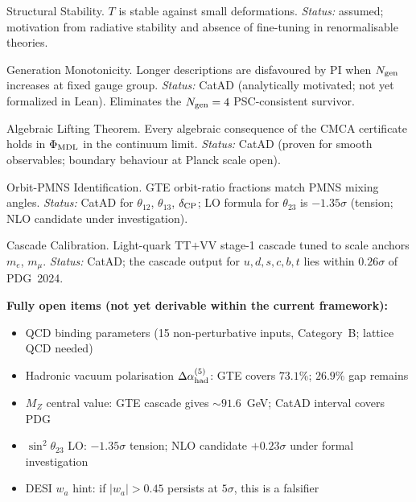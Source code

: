 \documentclass[11pt,openany]{book}
\theoremstyle{remark}
\begin{document}
\begin{appendices}
\begin{tcolorbox}[colback=blue!5,colframe=blue!50,
  title={\textbf{Named Assumptions and Open Gaps}},
  fonttitle=\bfseries,left=6pt,right=6pt,top=5pt,bottom=5pt]
\begin{description}[noitemsep,topsep=4pt,leftmargin=2.2cm,labelwidth=2.0cm,font=\bfseries]
\item[NM*]  Structural Stability.  $T$ is stable against small deformations.
  \emph{Status:} assumed; motivation from radiative stability and absence of fine-tuning
  in renormalisable theories.
\item[Gen-Mon]  Generation Monotonicity.  Longer descriptions are disfavoured by PI when
  $N_{\rm gen}$ increases at fixed gauge group.  \emph{Status:} CatAD (analytically
  motivated; not yet formalized in Lean).  Eliminates the $N_{\rm gen}=4$ PSC-consistent
  survivor.
\item[Lifting]  Algebraic Lifting Theorem.  Every algebraic consequence of the CMCA
  certificate holds in $\Phi_{\rm MDL}$ in the continuum limit.  \emph{Status:} CatAD
  (proven for smooth observables; boundary behaviour at Planck scale open).
\item[Orbit-PMNS]  Orbit-PMNS Identification.  GTE orbit-ratio fractions match PMNS
  mixing angles.  \emph{Status:} CatAD for $\theta_{12}$, $\theta_{13}$, $\delta_{\rm CP}$;
  LO formula for $\theta_{23}$ is $-1.35\sigma$ (tension; NLO candidate under investigation).
\item[Cascade-Cal]  Cascade Calibration.  Light-quark TT$+$VV stage-1 cascade tuned to
  scale anchors $m_e$, $m_\mu$.  \emph{Status:} CatAD; the cascade output for $u,d,s,c,b,t$
  lies within $0.26\sigma$ of PDG~2024.
\end{description}

\medskip
\noindent
\textbf{Fully open items (not yet derivable within the current framework):}
\begin{itemize}[noitemsep,topsep=2pt]
\item QCD binding parameters (15 non-perturbative inputs, Category~B; lattice QCD needed)
\item Hadronic vacuum polarisation $\Delta\alpha_{\rm had}^{(5)}$: GTE covers $73.1\%$; $26.9\%$ gap remains
\item $M_Z$ central value: GTE cascade gives ${\sim}91.6$~GeV; CatAD interval covers PDG
\item $\sin^2\theta_{23}$ LO: $-1.35\sigma$ tension; NLO candidate $+0.23\sigma$ under formal investigation
\item DESI $w_a$ hint: if $|w_a| > 0.45$ persists at $5\sigma$, this is a falsifier
\end{itemize}
\end{tcolorbox}


\end{appendices}
\end{document}
